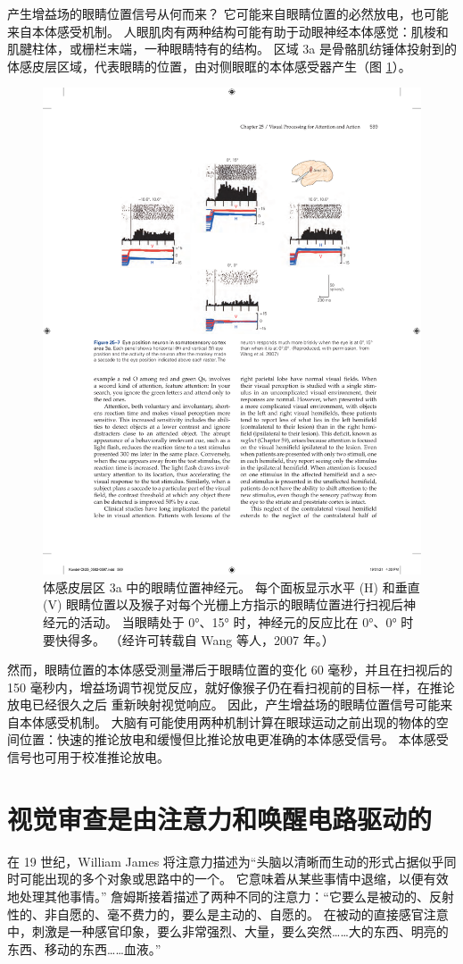产生增益场的眼睛位置信号从何而来？ 它可能来自眼睛位置的必然放电，也可能来自本体感受机制。 人眼肌肉有两种结构可能有助于动眼神经本体感觉：肌梭和肌腱柱体，或栅栏末端，一种眼睛特有的结构。 
区域 3a 是骨骼肌纺锤体投射到的体感皮层区域，代表眼睛的位置，由对侧眼眶的本体感受器产生（图 \ref{fig:25_7}）。

\begin{figure}[htbp]
	\centering
	\includegraphics[width=0.8\linewidth]{chap25/fig_25_7}
	\caption{体感皮层区 3a 中的眼睛位置神经元。 每个面板显示水平 (H) 和垂直 (V) 眼睛位置以及猴子对每个光栅上方指示的眼睛位置进行扫视后神经元的活动。 当眼睛处于 0°、15° 时，神经元的反应比在 0°、0° 时要快得多。 （经许可转载自 Wang 等人，2007 年。）}
	\label{fig:25_7}
\end{figure}


然而，眼睛位置的本体感受测量滞后于眼睛位置的变化 60 毫秒，并且在扫视后的 150 毫秒内，增益场调节视觉反应，就好像猴子仍在看扫视前的目标一样，在推论放电已经很久之后 重新映射视觉响应。 因此，产生增益场的眼睛位置信号可能来自本体感受机制。 大脑有可能使用两种机制计算在眼球运动之前出现的物体的空间位置：快速的推论放电和缓慢但比推论放电更准确的本体感受信号。 本体感受信号也可用于校准推论放电。


\section{视觉审查是由注意力和唤醒电路驱动的}
在 19 世纪，William James 将注意力描述为“头脑以清晰而生动的形式占据似乎同时可能出现的多个对象或思路中的一个。 它意味着从某些事情中退缩，以便有效地处理其他事情。” 詹姆斯接着描述了两种不同的注意力：“它要么是被动的、反射性的、非自愿的、毫不费力的，要么是主动的、自愿的。 在被动的直接感官注意中，刺激是一种感官印象，要么非常强烈、大量，要么突然……大的东西、明亮的东西、移动的东西……血液。”

